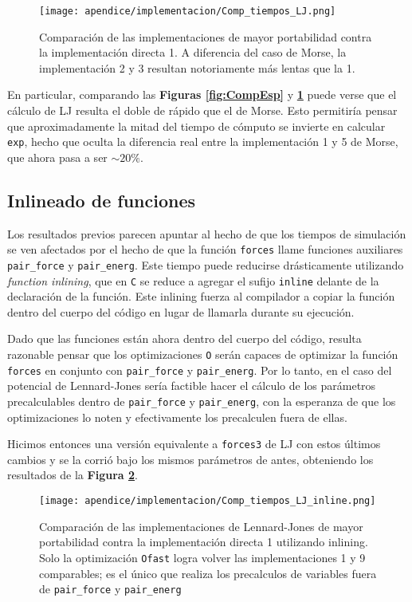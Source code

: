 \begin{figure}[h]
	\centering
	\texttt{[image: apendice/implementacion/Comp\_tiempos\_LJ.png]}
	\caption{Comparación de las implementaciones de mayor portabilidad contra la implementación directa 1. 
	A diferencia del caso de Morse, la implementación 2 y 3 resultan notoriamente más lentas que la 1.}
	\label{fig:CompEsp_LJ}
\end{figure}

En particular, comparando las \textbf{Figuras \ref{fig:CompEsp}} y \textbf{\ref{fig:CompEsp_LJ}} puede verse que el cálculo de LJ resulta el doble de rápido que el de Morse. 
Esto permitiría pensar que aproximadamente la mitad del tiempo de cómputo se invierte en calcular \texttt{exp}, hecho que oculta la diferencia real entre la implementación 1 y 5 de Morse, 
que ahora pasa a ser $\sim 20\%$. 

\subsection{Inlineado de funciones}

Los resultados previos parecen apuntar al hecho de que los tiempos de simulación se ven afectados por el hecho de que la función \texttt{forces} llame funciones auxiliares \texttt{pair\_force} 
y \texttt{pair\_energ}. 
Este tiempo puede reducirse drásticamente utilizando \textit{function inlining}, que en \texttt{C} se reduce a agregar el sufijo \texttt{inline} delante de la declaración de la función. 
Este inlining fuerza al compilador a copiar la función dentro del cuerpo del código en lugar de llamarla durante su ejecución. 

Dado que las funciones están ahora dentro del cuerpo del código, resulta razonable pensar que los optimizaciones \texttt{O} serán capaces de optimizar la función \texttt{forces} en conjunto 
con \texttt{pair\_force} y \texttt{pair\_energ}. 
Por lo tanto, en el caso del potencial de Lennard-Jones sería factible hacer el cálculo de los parámetros precalculables dentro de \texttt{pair\_force} y \texttt{pair\_energ}, con la esperanza 
de que los optimizaciones lo noten y efectivamente los precalculen fuera de ellas.

Hicimos entonces una versión equivalente a \texttt{forces3} de LJ con estos últimos cambios y se la corrió bajo los mismos parámetros de antes, obteniendo los resultados de la 
\textbf{Figura \ref{fig:CompEsp_LJ_inline}}.

\begin{figure}[h]
	\centering
	\texttt{[image: apendice/implementacion/Comp\_tiempos\_LJ\_inline.png]}
	\caption{Comparación de las implementaciones de Lennard-Jones de mayor portabilidad contra la implementación directa 1 utilizando inlining. 
	Solo la optimización \texttt{Ofast} logra volver las implementaciones 1 y 9 comparables; es el único que realiza los precalculos de variables fuera de \texttt{pair\_force} y \texttt{pair\_energ}}
	\label{fig:CompEsp_LJ_inline}
\end{figure}


